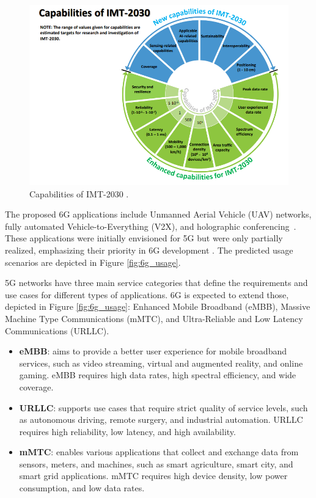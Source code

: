\begin{figure}[H]
    \centering
    \includegraphics[width=0.8\linewidth]{figures/capabilities 6g.png}
    \caption[Capabilities of IMT-2030]{Capabilities of IMT-2030 \cite{ITU_2160-0}.}
    \label{fig:6g_capab}
\end{figure}

The proposed 6G applications include Unmanned Aerial Vehicle (UAV) networks, fully automated Vehicle-to-Everything (V2X), and holographic conferencing~\cite{6G_ITU}. These applications were initially envisioned for 5G but were only partially realized, emphasizing their priority in 6G development \cite{6G_ITU}. The predicted usage scenarios are depicted in Figure \ref{fig:6g_usage}.

5G networks have three main service categories that define the requirements and use cases for different types of applications. 6G is expected to extend those, depicted in Figure \ref{fig:6g_usage}: Enhanced Mobile Broadband (eMBB), Massive Machine Type Communications (mMTC), and Ultra-Reliable and Low Latency Communications (URLLC). 
\begin{itemize}
    \item \textbf{eMBB}: aims to provide a better user experience for mobile broadband services, such as video streaming, virtual and augmented reality, and online gaming. eMBB requires high data rates, high spectral efficiency, and wide coverage.
    \item \textbf{URLLC}: supports use cases that require strict quality of service levels, such as autonomous driving, remote surgery, and industrial automation. URLLC requires high reliability, low latency, and high availability.
    \item \textbf{mMTC}: enables various applications that collect and exchange data from sensors, meters, and machines, such as smart agriculture, smart city, and smart grid applications. mMTC requires high device density, low power consumption, and low data rates.
\end{itemize}

